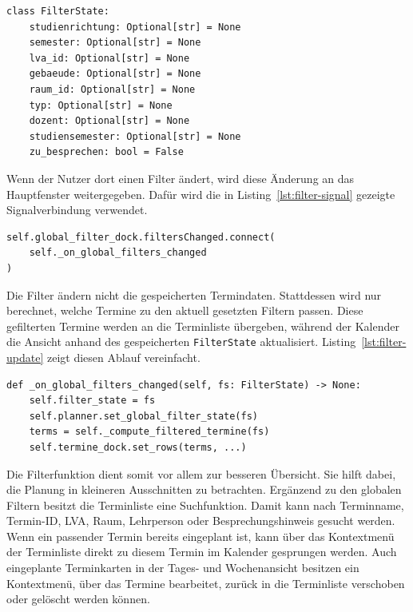 \documentclass[12pt,a4paper]{article}
\begin{document}
\begin{lstlisting}[caption={Filterzustand der globalen Filter}, label={lst:filter-state}]
class FilterState:
    studienrichtung: Optional[str] = None
    semester: Optional[str] = None
    lva_id: Optional[str] = None
    gebaeude: Optional[str] = None
    raum_id: Optional[str] = None
    typ: Optional[str] = None
    dozent: Optional[str] = None
    studiensemester: Optional[str] = None
    zu_besprechen: bool = False
\end{lstlisting}

Wenn der Nutzer dort einen Filter ändert, wird diese Änderung an das Hauptfenster weitergegeben. Dafür wird die in Listing~\ref{lst:filter-signal} gezeigte Signalverbindung verwendet.

\begin{lstlisting}[caption={Signalverbindung der globalen Filter}, label={lst:filter-signal}]
self.global_filter_dock.filtersChanged.connect(
    self._on_global_filters_changed
)
\end{lstlisting}

Die Filter ändern nicht die gespeicherten Termindaten. Stattdessen wird nur berechnet, welche Termine zu den aktuell gesetzten Filtern passen. Diese gefilterten Termine werden an die Terminliste übergeben, während der Kalender die Ansicht anhand des gespeicherten \texttt{FilterState} aktualisiert. Listing~\ref{lst:filter-update} zeigt diesen Ablauf vereinfacht.

\begin{lstlisting}[caption={Aktualisierung nach geänderten Filtern}, label={lst:filter-update}]
def _on_global_filters_changed(self, fs: FilterState) -> None:
    self.filter_state = fs
    self.planner.set_global_filter_state(fs)
    terms = self._compute_filtered_termine(fs)
    self.termine_dock.set_rows(terms, ...)
\end{lstlisting}

Die Filterfunktion dient somit vor allem zur besseren Übersicht. Sie hilft dabei, die Planung in kleineren Ausschnitten zu betrachten.
Ergänzend zu den globalen Filtern besitzt die Terminliste eine Suchfunktion. Damit kann nach Terminname, Termin-ID, LVA, Raum, Lehrperson oder Besprechungshinweis gesucht werden. Wenn ein passender Termin bereits eingeplant ist, kann über das Kontextmenü der Terminliste direkt zu diesem Termin im Kalender gesprungen werden.
Auch eingeplante Terminkarten in der Tages- und Wochenansicht besitzen ein Kontextmenü, über das Termine bearbeitet, zurück in die Terminliste verschoben oder gelöscht werden können.
\end{document}
